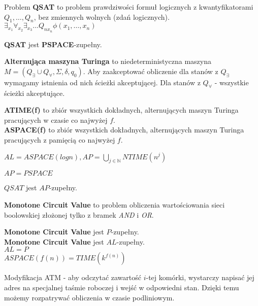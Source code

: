 \begin{definicja}
    Problem \textbf{QSAT} to problem prawdziwości formuł logicznych z kwantyfikatorami $Q_1,\ldots,Q_n$, bez zmiennych wolnych (zdań logicznych). $\exists_{x_1}\forall_{x_2}\exists_{x_3}\ldots Q_{nx_n}\phi(x_1,\ldots,x_n)$
\end{definicja}

\begin{twierdzenie}
    \textbf{QSAT} jest \textbf{PSPACE}-zupełny.
\end{twierdzenie}

\begin{definicja}
    \textbf{Alternująca maszyna Turinga} to niedeterministyczna maszyna $M=(Q_{\exists}\cup Q_{\forall},\Sigma,\delta,q_0)$. 
    Aby zaakceptować obliczenie dla stanów z $Q_{\exists}$ wymagamy istnienia od nich ścieżki akceptującej.
    Dla stanów z $Q_{\forall}$ - wszystkie ścieżki akceptujące.
\end{definicja}

\begin{definicja}
    \textbf{ATIME(f)} to zbiór wszystkich dokładnych, alternujących maszyn Turinga pracujących w czasie co najwyżej $f$. \\
    \textbf{ASPACE(f)} to zbiór wszystkich dokładnych, alternujących maszyn Turinga pracujących z pamięcią co najwyżej $f$.
\end{definicja}

\begin{definicja}
    $AL=ASPACE(logn),AP=\bigcup_{j\in \mathbb{N}}NTIME(n^j)$
\end{definicja}

\begin{twierdzenie}
    $AP=PSPACE$
\end{twierdzenie}

\begin{twierdzenie}
    $QSAT$ jest $AP$-zupełny.
\end{twierdzenie}

\begin{definicja}
    \textbf{Monotone Circuit Value} to problem obliczenia wartościowania sieci boolowskiej złożonej tylko z bramek \textit{AND} i \textit{OR}.
\end{definicja}

\begin{twierdzenie}
    \textbf{Monotone Circuit Value} jest $P$-zupełny. \\
    \textbf{Monotone Circuit Value} jest $AL$-zupełny. \\
    $AL=P$ \\
    $ASPACE(f(n))=TIME(k^{f(n)})$
\end{twierdzenie}

\begin{definicja}
    Modyfikacja ATM - aby odczytać zawartość $i$-tej komórki, wystarczy napisać jej adres na specjalnej taśmie roboczej i wejść w odpowiedni stan.
    Dzięki temu możemy rozpatrywać obliczenia w czasie podliniowym.
\end{definicja}


